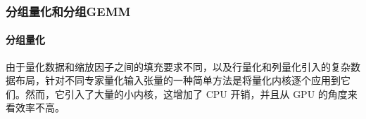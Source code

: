 \documentclass[10pt,logo,copyright]{nvidiatechreport_zh}
\begin{document}




\subsubsection{分组量化和分组GEMM}

\paragraph{分组量化}

由于量化数据和缩放因子之间的填充要求不同，以及行量化和列量化引入的复杂数据布局，针对不同专家量化输入张量的一种简单方法是将量化内核逐个应用到它们。然而，它引入了大量的小内核，这增加了 CPU 开销，并且从 GPU 的角度来看效率不高。
\end{document}

